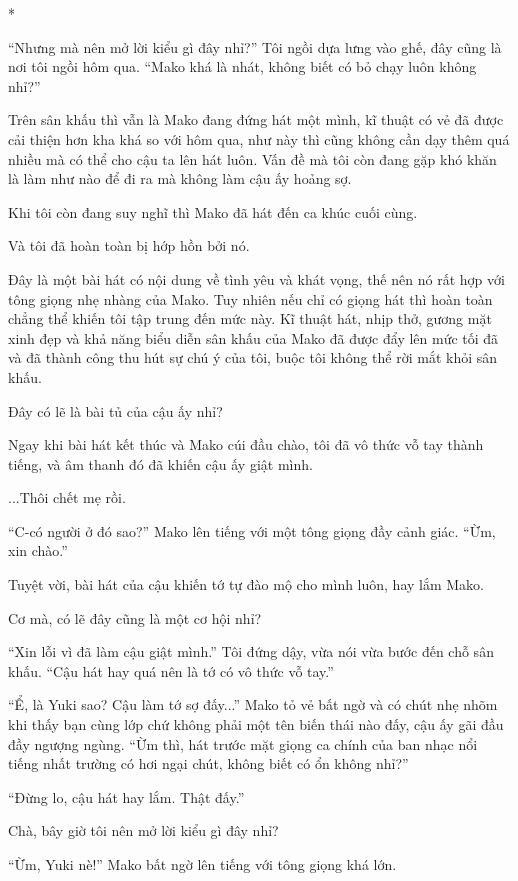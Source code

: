 {*

``Nhưng mà nên mở lời kiểu gì đây nhỉ?'' Tôi ngồi dựa lưng vào ghế, đây
cũng là nơi tôi ngồi hôm qua. ``Mako khá là nhát, không biết có bỏ chạy
luôn không nhỉ?''

Trên sân khấu thì vẫn là Mako đang đứng hát một mình, kĩ thuật có vẻ đã
được cải thiện hơn kha khá so với hôm qua, như này thì cũng không cần
dạy thêm quá nhiều mà có thể cho cậu ta lên hát luôn. Vấn đề mà tôi còn
đang gặp khó khăn là làm như nào để đi ra mà không làm cậu ấy hoảng sợ.

Khi tôi còn đang suy nghĩ thì Mako đã hát đến ca khúc cuối cùng.

Và tôi đã hoàn toàn bị hớp hồn bởi nó.

Đây là một bài hát có nội dung về tình yêu và khát vọng, thế nên nó rất
hợp với tông giọng nhẹ nhàng của Mako. Tuy nhiên nếu chỉ có giọng hát
thì hoàn toàn chẳng thể khiến tôi tập trung đến mức này. Kĩ thuật hát,
nhịp thở, gương mặt xinh đẹp và khả năng biểu diễn sân khấu của Mako đã
được đẩy lên mức tối đã và đã thành công thu hút sự chú ý của tôi, buộc
tôi không thể rời mắt khỏi sân khấu.

Đây có lẽ là bài tủ của cậu ấy nhỉ?

Ngay khi bài hát kết thúc và Mako cúi đầu chào, tôi đã vô thức vỗ tay
thành tiếng, và âm thanh đó đã khiến cậu ấy giật mình.

...Thôi chết mẹ rồi.

``C-có người ở đó sao?'' Mako lên tiếng với một tông giọng đầy cảnh
giác. ``Ừm, xin chào.''

Tuyệt vời, bài hát của cậu khiến tớ tự đào mộ cho mình luôn, hay lắm
Mako.

Cơ mà, có lẽ đây cũng là một cơ hội nhỉ?

``Xin lỗi vì đã làm cậu giật mình.'' Tôi đứng dậy, vừa nói vừa bước đến
chỗ sân khấu. ``Cậu hát hay quá nên là tớ có vô thức vỗ tay.''

``Ể, là Yuki sao? Cậu làm tớ sợ đấy...'' Mako tỏ vẻ bất ngờ và có chút
nhẹ nhõm khi thấy bạn cùng lớp chứ không phải một tên biến thái nào đấy,
cậu ấy gãi đầu đầy ngượng ngùng. ``Ừm thì, hát trước mặt giọng ca chính
của ban nhạc nổi tiếng nhất trường có hơi ngại chút, không biết có ổn
không nhỉ?''

``Đừng lo, cậu hát hay lắm. Thật đấy.''

Chà, bây giờ tôi nên mở lời kiểu gì đây nhỉ?

``Ừm, Yuki nè!'' Mako bất ngờ lên tiếng với tông giọng khá lớn.

}
